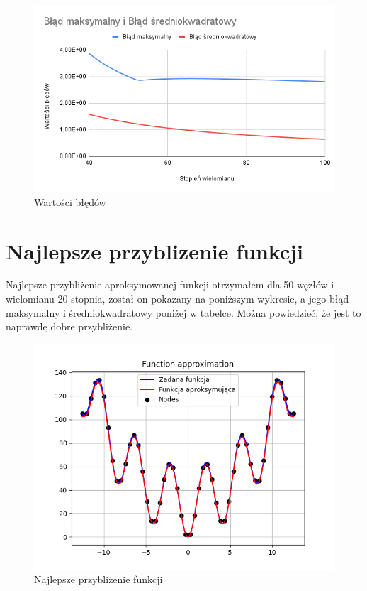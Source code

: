 \documentclass{article}
\begin{document}
\begin{figure}[H]
  \centering
  \begin{minipage}[b]{0.4\textwidth}
    \includegraphics[width=\textwidth]{img48.png}
    \caption{Wartości błędów}
  \end{minipage}
\end{figure}

\newpage

\section{Najlepsze przyblizenie funkcji}

Najlepsze przybliżenie aproksymowanej funkcji otrzymałem dla 50 węzłów i wielomianu 20 stopnia, został on pokazany na poniższym wykresie, a jego błąd maksymalny i średniokwadratowy poniżej w tabelce. Można powiedzieć, że jest to naprawdę dobre przybliżenie.

\begin{figure}[H]
  \centering
  \begin{minipage}[b]{0.4\textwidth}
    \includegraphics[width=\textwidth]{best.png}
    \caption{Najlepsze przybliżenie funkcji}
  \end{minipage}
\end{figure}
\end{document}
